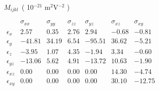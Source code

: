 \documentclass[a4paper,10pt]{article}
\title{}
\author{}
\date{}
\begin{document}
\maketitle

\noindent

$M_{ijkl}$~( 10$^{-21}$ m$^{2}$V$^{-2}$ )

$
\begin{matrix}
              & \sigma_{xx} & \sigma_{yy} & \sigma_{zz} & \sigma_{yz} & \sigma_{xz} & \sigma_{xy} \\ 
\epsilon_{x}  &    2.57     &    0.35     &    2.76     &    2.94     &   -0.68     &   -0.81 \\ 
\epsilon_{y}  &  -41.81     &   34.19     &    6.54     &  -95.51     &   36.62     &   -5.21 \\ 
\epsilon_{z}  &   -3.95     &    1.07     &    4.35     &   -1.94     &    3.34     &   -0.60 \\ 
\epsilon_{yz} &  -13.06     &    5.62     &    4.91     &  -13.72     &   10.63     &   -1.90 \\ 
\epsilon_{xz} &    0.00     &    0.00     &    0.00     &    0.00     &   14.30     &   -4.74 \\ 
\epsilon_{xy} &    0.00     &    0.00     &    0.00     &    0.00     &   30.10     &  -12.75 \\
\end{matrix}
$
\end{document}
